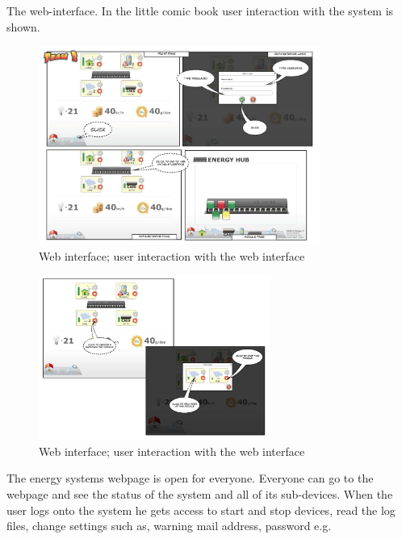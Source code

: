 		\newpage
		The web-interface. In the little comic book user interaction with the system is shown.
		\begin{figure}[h!]		%
			\begin{centering}
				 \includegraphics[width=0.82\textwidth]{images/web_interface1.jpg}
				\caption{Web interface; user interaction with the web interface}
		 	\end{centering}
		\end{figure}

		\begin{figure}[h!]		%
			\begin{centering}
				 \includegraphics[width=0.68\textwidth]{images/web_interface2.jpg}
				\caption{Web interface; user interaction with the web interface}
		 	\end{centering}
		\end{figure}			
		The energy systems webpage is open for everyone. Everyone can go to the webpage and see the status of the system and all of its sub-devices.
		When the user logs onto the system he gets access to start and stop devices, read the log files, change settings such as, warning mail address,
		password e.g.
